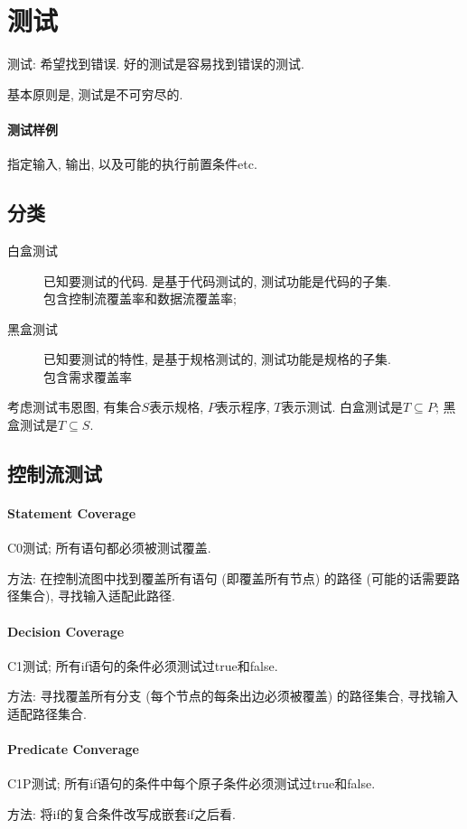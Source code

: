 \documentclass{ctexart}
\begin{document}
\section{测试}
    测试: 希望找到错误.
    好的测试是容易找到错误的测试.\par
    基本原则是, 测试是不可穷尽的.
\paragraph{测试样例} 指定输入, 输出, 以及可能的执行前置条件etc.
\subsection{分类}
    \begin{description}
        \item[白盒测试] 已知要测试的代码. 是基于代码测试的, 测试功能是代码的子集.\\
            包含控制流覆盖率和数据流覆盖率;
        \item[黑盒测试] 已知要测试的特性, 是基于规格测试的, 测试功能是规格的子集.\\
            包含需求覆盖率
    \end{description}
    考虑测试韦恩图, 有集合$S$表示规格, $P$表示程序, $T$表示测试.
    白盒测试是$T \subseteq P$; 黑盒测试是$T \subseteq S$.
\subsection{控制流测试}
\paragraph{Statement Coverage}
    C0测试; 所有语句都必须被测试覆盖.\par
    方法: 在控制流图中找到覆盖所有语句 (即覆盖所有节点) 的路径 (可能的话需要路径集合), 寻找输入适配此路径.
\paragraph{Decision Coverage}
    C1测试; 所有if语句的条件必须测试过true和false.\par
    方法: 寻找覆盖所有分支 (每个节点的每条出边必须被覆盖) 的路径集合, 寻找输入适配路径集合.
\paragraph{Predicate Converage}
    C1P测试; 所有if语句的条件中每个原子条件必须测试过true和false.\par
    方法: 将if的复合条件改写成嵌套if之后看.
\end{document}
